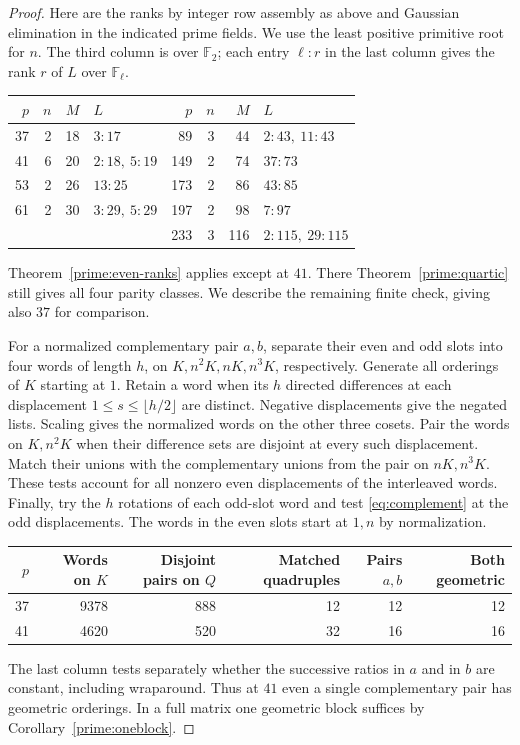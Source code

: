 \documentclass[11pt,a4paper]{article}
\numberwithin{equation}{section}
\begin{document}
\begin{proof}
Here are the ranks by integer row assembly as above and Gaussian elimination in the indicated prime fields. We use the least positive primitive root for $n$. The third column is over $\mathbb F_2$; each entry $\ell:r$ in the last column gives the rank $r$ of $L$ over $\mathbb F_\ell$.
\begin{center}
\begin{tabular}{rrrl@{\qquad}rrrl}
\toprule
$p$ & $n$ & $M$ & $L$ & $p$ & $n$ & $M$ & $L$\\\midrule
37&2&18&$3:17$ & 89&3&44&$2:43,\ 11:43$\\
41&6&20&$2:18,\ 5:19$ &149&2&74&$37:73$\\
53&2&26&$13:25$ &173&2&86&$43:85$\\
61&2&30&$3:29,\ 5:29$ &197&2&98&$7:97$\\
&&&&233&3&116&$2:115,\ 29:115$\\\bottomrule
\end{tabular}
\end{center}
Theorem~\ref{prime:even-ranks} applies except at $41$. There Theorem~\ref{prime:quartic} still gives all four parity classes. We describe the remaining finite check, giving also $37$ for comparison.

For a normalized complementary pair $a,b$, separate their even and odd slots into four words of length $h$, on $K,n^2K,nK,n^3K$, respectively. Generate all orderings of $K$ starting at $1$. Retain a word when its $h$ directed differences at each displacement $1\le s\le\lfloor h/2\rfloor$ are distinct. Negative displacements give the negated lists. Scaling gives the normalized words on the other three cosets. Pair the words on $K,n^2K$ when their difference sets are disjoint at every such displacement. Match their unions with the complementary unions from the pair on $nK,n^3K$. These tests account for all nonzero even displacements of the interleaved words. Finally, try the $h$ rotations of each odd-slot word and test \eqref{eq:complement} at the odd displacements. The words in the even slots start at $1,n$ by normalization.
\begin{center}
\begin{tabular}{rrrrrr}
\toprule
$p$ & Words on $K$ & Disjoint pairs on $Q$ & Matched quadruples & Pairs $a,b$ & Both geometric\\\midrule
37&9378&888&12&12&12\\
41&4620&520&32&16&16\\\bottomrule
\end{tabular}
\end{center}
The last column tests separately whether the successive ratios in $a$ and in $b$ are constant, including wraparound. Thus at $41$ even a single complementary pair has geometric orderings. In a full matrix one geometric block suffices by Corollary~\ref{prime:oneblock}.
\end{proof}
\end{document}

